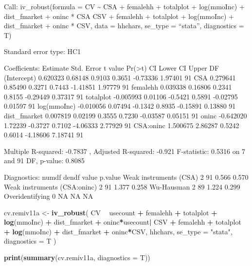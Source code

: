 \documentclass[
]{article}
\newenvironment{Shaded}{\begin{snugshade}}{\end{snugshade}}
\newcommand{\DataTypeTok}[1]{\textcolor[rgb]{0.13,0.29,0.53}{#1}}
\newcommand{\KeywordTok}[1]{\textcolor[rgb]{0.13,0.29,0.53}{\textbf{#1}}}
\newcommand{\NormalTok}[1]{#1}
\newcommand{\OperatorTok}[1]{\textcolor[rgb]{0.81,0.36,0.00}{\textbf{#1}}}
\newcommand{\StringTok}[1]{\textcolor[rgb]{0.31,0.60,0.02}{#1}}
\begin{document}
Call: iv\_robust(formula = CV \textasciitilde{} CSA + femalehh +
totalplot + log(mmoInc) + dist\_fmarket + oninc * CSA \textbar{} CSV +
femalehh + totalplot + log(mmoInc) + dist\_fmarket + oninc * CSV, data =
hhchars, se\_type = ``stata'', diagnostics = T)

Standard error type: HC1

Coefficients: Estimate Std. Error t value
Pr(\textgreater\textbar t\textbar) CI Lower CI Upper DF (Intercept)
0.620323 0.68148 0.9103 0.3651 -0.73336 1.97401 91 CSA 0.279641 0.85490
0.3271 0.7443 -1.41851 1.97779 91 femalehh 0.039338 0.16806 0.2341
0.8155 -0.29449 0.37317 91 totalplot -0.005993 0.01106 -0.5421 0.5891
-0.02795 0.01597 91 log(mmoInc) -0.010056 0.07494 -0.1342 0.8935
-0.15891 0.13880 91 dist\_fmarket 0.007819 0.02199 0.3555 0.7230
-0.03587 0.05151 91 oninc -0.642020 1.72239 -0.3727 0.7102 -4.06333
2.77929 91 CSA:oninc 1.500675 2.86287 0.5242 0.6014 -4.18606 7.18741 91

Multiple R-squared: -0.7837 , Adjusted R-squared: -0.921 F-statistic:
0.5316 on 7 and 91 DF, p-value: 0.8085

Diagnostics: numdf dendf value p.value Weak instruments (CSA) 2 91 0.566
0.570 Weak instruments (CSA:oninc) 2 91 1.377 0.258 Wu-Hausman 2 89
1.224 0.299 Overidentifying 0 NA NA NA

\begin{Shaded}
\begin{Highlighting}[]
\NormalTok{cv.remiv11a <-}
\StringTok{  }\KeywordTok{iv_robust}\NormalTok{(}
\NormalTok{    CV }\OperatorTok{~}\StringTok{ }\NormalTok{usecount }\OperatorTok{+}\StringTok{ }\NormalTok{femalehh }\OperatorTok{+}\StringTok{ }\NormalTok{totalplot }\OperatorTok{+}\StringTok{ }\KeywordTok{log}\NormalTok{(mmoInc) }\OperatorTok{+}\StringTok{ }\NormalTok{dist_fmarket }\OperatorTok{+}\StringTok{ }\NormalTok{oninc}\OperatorTok{*}\NormalTok{usecount}\OperatorTok{|}
\StringTok{      }\NormalTok{CSV }\OperatorTok{+}\StringTok{ }\NormalTok{femalehh }\OperatorTok{+}\StringTok{ }\NormalTok{totalplot }\OperatorTok{+}\StringTok{ }\KeywordTok{log}\NormalTok{(mmoInc) }\OperatorTok{+}\StringTok{ }\NormalTok{dist_fmarket }\OperatorTok{+}\StringTok{ }\NormalTok{oninc}\OperatorTok{*}\NormalTok{CSV,}
\NormalTok{    hhchars,}
    \DataTypeTok{se_type =} \StringTok{"stata"}\NormalTok{,}
    \DataTypeTok{diagnostics =}\NormalTok{ T}
\NormalTok{  )}

\KeywordTok{print}\NormalTok{(}\KeywordTok{summary}\NormalTok{(cv.remiv11a, }\DataTypeTok{diagnostics =}\NormalTok{ T))}
\end{Highlighting}
\end{Shaded}
\end{document}
